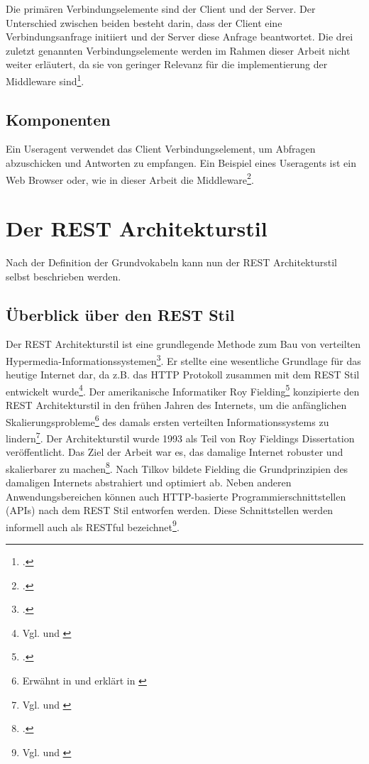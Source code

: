 Die primären Verbindungselemente sind der Client und der Server. Der Unterschied zwischen beiden besteht darin, dass der Client eine Verbindungsanfrage initiiert und der Server diese Anfrage beantwortet. Die drei zuletzt genannten Verbindungselemente werden im Rahmen dieser Arbeit nicht weiter erläutert, da sie von geringer Relevanz für die implementierung der Middleware sind\footcite[Vgl. ][S. 92ff]{fielding_architectural_2000}.

\subsection{Komponenten}\label{subsection:komponenten}

Ein Useragent verwendet das Client Verbindungselement, um Abfragen abzuschicken und Antworten zu empfangen. Ein Beispiel eines Useragents ist ein Web Browser oder, wie in dieser Arbeit die Middleware\footcite[Vgl. ][S. 96ff]{fielding_architectural_2000}.

\section{Der REST Architekturstil}\label{subsection:der-rest-architekturstil}

Nach der Definition der Grundvokabeln kann nun der REST Architekturstil selbst beschrieben werden.

\subsection{Überblick über den REST Stil}\label{subsection:ueberblick-ueber-den-rest-stil}

Der REST Architekturstil ist eine grundlegende Methode zum Bau von verteilten Hypermedia-Informationssystemen\footcite[Vgl. ][S. 76]{fielding_architectural_2000}. Er stellte eine wesentliche Grundlage für das heutige Internet dar, da z.B. das HTTP Protokoll zusammen mit dem REST Stil entwickelt wurde\footnote{Vgl. \cite{fielding_hypertext_1999} und \cite[S. 9]{tilkov_rest_2015}}. Der amerikanische Informatiker Roy Fielding\footcite[Vgl. ][]{fielding_roy_2021} konzipierte den REST Architekturstil in den frühen Jahren des Internets, um die anfänglichen Skalierungsprobleme\footnote{Erwähnt in \cite{fielding_architectural_2000} und  erklärt in \cite{berners-lee_world-wide_1994}} des damals ersten verteilten Informationssystems zu lindern\footnote{Vgl. \cite[S. 1]{fielding_architectural_2000} und \cite[S. 9]{tilkov_rest_2015}}. Der Architekturstil wurde 1993 als Teil von Roy Fieldings Dissertation veröffentlicht. Das Ziel der Arbeit war es, das damalige Internet robuster und skalierbarer zu machen\footcite[Vgl. ][S. 3]{fielding_architectural_2000}. Nach Tilkov bildete Fielding die Grundprinzipien des damaligen Internets abstrahiert und optimiert ab. Neben anderen Anwendungsbereichen können auch HTTP-basierte Programmierschnittstellen (APIs) nach dem REST Stil entworfen werden. Diese Schnittstellen werden informell auch als RESTful bezeichnet\footnote{Vgl. \cite{rodriguez_restful_2008} und \cite[S. 10]{tilkov_rest_2015}}. 

